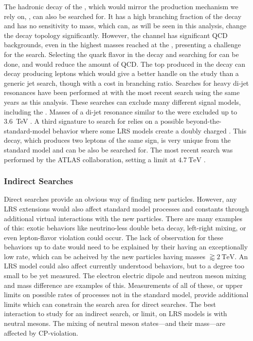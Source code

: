 The hadronic decay of the \WR, which would mirror the production mechanism we rely on, \WRtoQQ, can also be searched for.  It has a high branching fraction of the \WR decay and has no sensitivity to \NR mass, which can, as will be seen in this analysis, change the \WR decay topology significantly. However, the \WRtoQQ \xspace channel has significant QCD backgrounds, even in the highest masses reached at the \LHC, presenting a challenge for the search. Selecting the quark flavor in the decay and searching for \WRtoTB\xspace can be done, and would reduce the amount of QCD. The top produced in the \WR decay can decay producing leptons which would give a better handle on the study than a generic jet search, though with a cost in branching ratio. Searches for heavy di-jet resonances have been performed at \CMS with the most recent search using the same years as this analysis.  These searches can exclude many different signal models, including the \WR.  Masses of a di-jet resonance similar to the \WR were excluded up to \SI{3.6}{\TeV} \cite{dijetRunIICMS}.  A third \WR signature to search for relies on a possible beyond-the-standard-model behavior where some LRS models create a doubly charged \WR. This decay, which produces two leptons of the same sign, is very unique from the standard model and can be also be searched for. The most recent search was performed by the ATLAS collaboration, setting a limit at \ensuremath{\SI{4.7}{\TeV}} \cite{ATLASresWR}.

\subsubsection{Indirect Searches}
Direct searches provide an obvious way of finding new particles. However, any LRS extensions would also affect standard model processes and constants through additional virtual interactions with the new particles. There are many examples of this: exotic behaviors like neutrino-less double beta decay, left-right mixing, or even lepton-flavor violation could occur. The lack of observation for these behaviors up to date would need to be explained by their having an exceptionally low rate, which can be acheived by the new particles having masses $\gtrapprox \SI{2}{\TeV}$. An LRS model could also affect currently understood behaviors, but to a degree too small to be yet measured.  The electron electric dipole and neutron meson mixing and mass difference are examples of this.  Measurements of all of these, or upper limits on possible rates of processes not in the standard model, provide additional limits which can constrain the search area for direct searches.  The best interaction to study for an indirect search, or limit, on LRS models is with neutral mesons.  The mixing of neutral meson states---and their mass---are affected by CP-violation.

